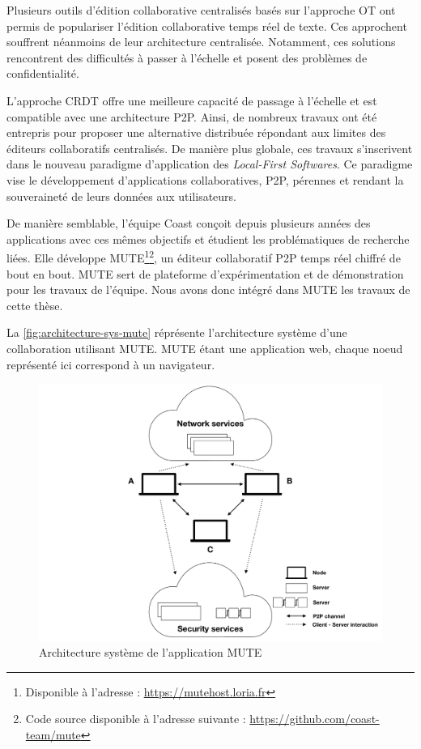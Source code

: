 \documentclass[12pt]{thesul}
\begin{document}
Plusieurs outils d'édition collaborative centralisés basés sur l'approche OT ont permis de populariser l'édition collaborative temps réel de texte\cite{gdocs, etherpad}.
Ces approchent souffrent néanmoins de leur architecture centralisée.
Notamment, ces solutions rencontrent des difficultés à passer à l'échelle\cite{2015-cope-delay-collaborative-note-taking-ignat, 2016-performance-collaborative-editors-dang-ignat} et posent des problèmes de confidentialité\cite{prism-washington-post, prism-guardian}.

L'approche \ac{CRDT} offre une meilleure capacité de passage à l'échelle et est compatible avec une architecture \ac{P2P}\cite{ahmednacer:inria-00629503}.
Ainsi, de nombreux travaux\cite{Nedelec2016CRATE, peerpad, serenity-notes} ont été entrepris pour proposer une alternative distribuée répondant aux limites des éditeurs collaboratifs centralisés.
De manière plus globale, ces travaux s'inscrivent dans le nouveau paradigme d'application des \emph{Local-First Softwares}\cite{localfirstsoftware2019, pushpin2020}.
Ce paradigme vise le développement d'applications collaboratives, \ac{P2P}, pérennes et rendant la souveraineté de leurs données aux utilisateurs.

De manière semblable, l'équipe Coast conçoit depuis plusieurs années des applications avec ces mêmes objectifs et étudient les problématiques de recherche liées.
Elle développe \acf{MUTE}\cite{MUTE2017}\footnote{Disponible à l'adresse : \url{https://mutehost.loria.fr}}\footnote{Code source disponible à l'adresse suivante : \url{https://github.com/coast-team/mute}}, un éditeur collaboratif \ac{P2P} temps réel chiffré de bout en bout.
\ac{MUTE} sert de plateforme d'expérimentation et de démonstration pour les travaux de l'équipe.
Nous avons donc intégré dans \ac{MUTE} les travaux de cette thèse.

La \autoref{fig:architecture-sys-mute} réprésente l'architecture système d'une collaboration utilisant MUTE.
MUTE étant une application web, chaque noeud représenté ici correspond à un navigateur.

\begin{figure}[!ht]
  \centering
  \includegraphics[page=1, trim=0cm 0cm 0cm 0cm, clip, width=.7\linewidth]{img/mute-figures.pdf}
  \caption{Architecture système de l'application MUTE}
  \label{fig:architecture-sys-mute}
\end{figure}
\end{document}
